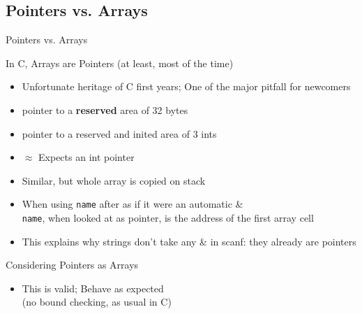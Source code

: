 \begin{Coupe}
\subsection{Pointers vs. Arrays}
\begin{frame}{Pointers vs. Arrays}
  \begin{block}{In C, \alert{Arrays are Pointers} (at least, most of the time)}
    \begin{itemize}
    \item Unfortunate heritage of C first years; One of the major pitfall for newcomers
    \item {} pointer to a \textbf{reserved} area of 32
      bytes
    \item {} pointer to a reserved and
      inited area of 3 ints
    \item {} $\approx$
        Expects an int pointer 
    \item {} Similar, but whole array is
      copied on stack
    \item When using \texttt{name} after  as
      if it were an automatic \&\\
      {\texttt{name}, when looked at as pointer, is the address of the first
        array cell}
    \item This explains why strings don't take any \& in scanf: they already
      are pointers
    \end{itemize}
  \end{block}

  \begin{block}{Considering Pointers as Arrays}
    \begin{itemize}
    \item {} This is valid;
      Behave as expected\\
      {\small (no bound checking, as usual in C)}
    \end{itemize}
  \end{block}


\end{frame}
\end{Coupe}
